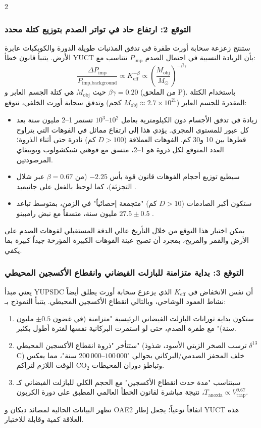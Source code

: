 \documentclass[11pt,a4paper]{article}
\begin{document}
\begin{multicols}{2}
		\subsubsection{التوقع 2: ارتفاع حاد في تواتر الصدم بتوزيع كتلة محدد}
		ستنتج زعزعة سحابة أورت طفرة في تدفق المذنبات طويلة الدورة والكويكبات عابرة الأرض. يتنبأ قانون خطأ YUCT بأن الزيادة النسبية في احتمال الصدم \(P_{\text{imp}}\) تتناسب مع:
		\[
		\frac{\Delta P_{\text{imp}}}{P_{\text{imp,background}}} \propto K_{\mathrm{eff}}^{-\beta} \propto \left(\frac{M_{\text{obj}}}{M_{\odot}}\right)^{-\beta\gamma}
		\]
		حيث \(M_{\text{obj}}\) هي كتلة الجسم العابر و \(\beta\gamma = 0.20\) (من الملحق P). باستخدام الكتلة المقدرة للجسم العابر (\(M_{\text{obj}} \approx 2.7\times10^{21}\) كجم) وتدفق سحابة أورت الخلفي، نتوقع:
		\begin{itemize}
			\item زيادة في تدفق الأجسام دون الكيلومترية بعامل \(10^{2}\)–\(10^{3}\) تستمر 1–2 مليون سنة بعد كل عبور للمستوى المجري. يؤدي هذا إلى ارتفاع مماثل في الفوهات التي يتراوح قطرها بين 10 و30 كم. الفوهات العملاقة (\(D>100\) كم) نادرة حتى أثناء الذروة؛ العدد المتوقع لكل ذروة هو 1–2، متسق مع فوهتي شيكشولوب وبوبيغاي المرصودتين.
			\item سيطيع توزيع أحجام الفوهات قانون قوة بأس \(-2.25\) (من \(\beta=0.67\) عبر شلال التجزئة)، كما لوحظ بالفعل على جانيميد \cite{Schenk2004}.
			\item ستكون أكبر الصادمات (\(D>10\) كم) "متجمعة إحصائياً" في الزمن، بمتوسط تباعد \(27.5 \pm 0.5\) مليون سنة، متسقاً مع نبض رامبينو \cite{Rampino2021}.
		\end{itemize}
		يمكن اختبار هذا التوقع من خلال التأريخ عالي الدقة المستقبلي لفوهات الصدم على الأرض والقمر والمريخ، بمجرد أن تصبح عينة الفوهات الكبيرة المؤرخة جيداً كبيرة بما يكفي.
		
		\subsubsection{التوقع 3: بداية متزامنة للبازلت الفيضاني وانقطاع الأكسجين المحيطي}
		يعني مبدأ YUPSDC أن نفس الانخفاض في \(K_{\mathrm{eff}}\) الذي يزعزع سحابة أورت يطلق أيضاً نشاط العمود الوشاحي، وبالتالي انقطاع الأكسجين المحيطي. يتنبأ النموذج بـ:
		\begin{enumerate}
			\item ستكون بداية ثورانات البازلت الفيضاني الرئيسية "متزامنة (في غضون \(\pm 0.5\) مليون سنة)" مع طفرة الصدم، حتى لو استمرت البركانية نفسها لفترة أطول بكثير.
			\item ستتأخر "ذروة انقطاع الأكسجين المحيطي" (ترسب الصخر الزيتي الأسود، شذوذ \(\delta^{13}\)C) خلف المحفز الصدمي/البركاني بحوالي "\(100\,000\)–\(200\,000\) سنة"، مما يعكس الوقت اللازم لتراكم CO\(_2\) وتباطؤ دوران المحيطات.
			\item سيتناسب "مدة حدث انقطاع الأكسجين" مع الحجم الكلي للبازلت الفيضاني كـ \(T_{\text{anoxia}} \propto V_{\text{trap}}^{0.67}\)، نتيجة مباشرة لقانون الخطأ العالمي المطبق على دورة الكربون.
		\end{enumerate}
		تظهر البيانات الحالية لمصائد ديكان و OAE2 اتفاقاً نوعياً؛ يجعل إطار YUCT هذه العلاقة كمية وقابلة للاختبار.
		

\end{multicols}
\end{document}

